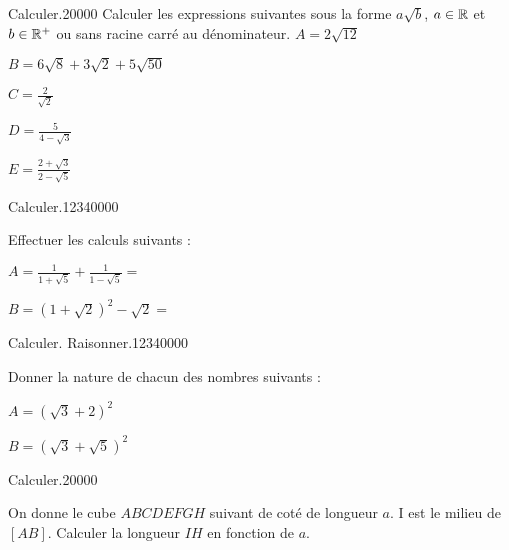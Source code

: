 
\begin{pageParcoursd} %





 



 \begin{ExoCdN}{Calculer.}{2}{0}{0}{0}{0}
Calculer les expressions suivantes sous la forme $a\sqrt{b}$, $a\in \mathbb R$ et $b \in \mathbb R^+$ ou sans racine carré au dénominateur.
$A=2\sqrt{12}$

$B= 6\sqrt{8} + 3\sqrt{2} + 5\sqrt{50}$

$C=\frac{2}{\sqrt{2}}$ 

$D= \frac{5}{4 - \sqrt{3}}$  

$E= \frac{2+\sqrt{3}}{2 - \sqrt{5}} $

\end{ExoCdN}




\begin{ExoCdN}{Calculer.}{1234}{0}{0}{0}{0}

Effectuer les calculs suivants : \vspace{0.4cm}

$A=\frac{1}{1+\sqrt5} +\frac{1}{1-\sqrt5} = $ 

$B=\left(1+\sqrt2\right)^2  -\sqrt2 = $ 
\end{ExoCdN}

 
\begin{ExoCdN}{Calculer. Raisonner.}{1234}{0}{0}{0}{0}

Donner la nature de chacun des nombres suivants : \vspace{0.4cm}

$A=\left( \sqrt3 + 2 \right)^2 $


$B=\left( \sqrt3 + \sqrt5 \right)^2 $
\end{ExoCdN}



 


\begin{ExoCdN}{Calculer.}{2}{0}{0}{0}{0}

 
On donne le cube $ABCDEFGH$ suivant de coté de longueur $a$. I est le milieu de $[AB]$. Calculer la longueur $IH$ en fonction de $a$.


\end{ExoCdN}
\end{pageParcoursd}
